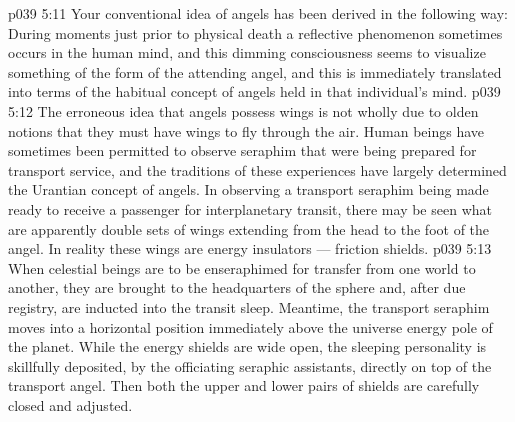 \vs p039 5:11 \pc Your conventional idea of angels has been derived in the following way: During moments just prior to physical death a reflective phenomenon sometimes occurs in the human mind, and this dimming consciousness seems to visualize something of the form of the attending angel, and this is immediately translated into terms of the habitual concept of angels held in that individual’s mind.
\vs p039 5:12 The erroneous idea that angels possess wings is not wholly due to olden notions that they must have wings to fly through the air. Human beings have sometimes been permitted to observe seraphim that were being prepared for transport service, and the traditions of these experiences have largely determined the Urantian concept of angels. In observing a transport seraphim being made ready to receive a passenger for interplanetary transit, there may be seen what are apparently double sets of wings extending from the head to the foot of the angel. In reality these wings are energy insulators --- friction shields.
\vs p039 5:13 \pc When celestial beings are to be enseraphimed for transfer from one world to another, they are brought to the headquarters of the sphere and, after due registry, are inducted into the transit sleep. Meantime, the transport seraphim moves into a horizontal position immediately above the universe energy pole of the planet. While the energy shields are wide open, the sleeping personality is skillfully deposited, by the officiating seraphic assistants, directly on top of the transport angel. Then both the upper and lower pairs of shields are carefully closed and adjusted.
